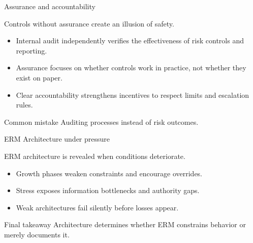 \documentclass[aspectratio=169, 10pt]{beamer} %
\begin{document}
\begin{frame}{Assurance and accountability}

Controls without assurance create an illusion of safety.

\medskip

\begin{itemize}
  \item[$\bullet$] Internal audit independently verifies the effectiveness of
  risk controls and reporting.

  \item[$\bullet$] Assurance focuses on whether controls work in practice,
  not whether they exist on paper.

  \item[$\bullet$] Clear accountability strengthens incentives to respect limits
  and escalation rules.
\end{itemize}

\begin{block}{Common mistake}
Auditing processes instead of risk outcomes.
\end{block}

\end{frame}

\begin{frame}{ERM Architecture under pressure}

ERM architecture is revealed when conditions deteriorate.

\medskip

\begin{itemize}
  \item[$\bullet$] Growth phases weaken constraints and encourage overrides.
  \item[$\bullet$] Stress exposes information bottlenecks and authority gaps.
  \item[$\bullet$] Weak architectures fail silently before losses appear.
\end{itemize}

\begin{block}{Final takeaway}
Architecture determines whether ERM constrains behavior or merely documents it.
\end{block}

\end{frame}
\end{document}
